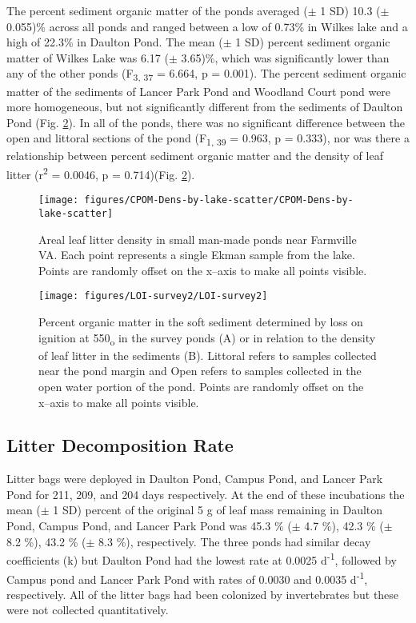 \documentclass{article}
\begin{document}
The percent sediment organic matter of the ponds averaged ($\pm$ 1 SD) 10.3 ($\pm$ 0.055)\% across all ponds and ranged between a low of 0.73\% in Wilkes lake and a high of 22.3\% in Daulton Pond. The mean ($\pm$ 1 SD) percent sediment organic matter of Wilkes Lake was 6.17 ($\pm$ 3.65)\%, which was significantly lower than any of the other ponds (F\textsubscript{3, 37} = 6.664, p = 0.001). The percent sediment organic matter of the sediments of Lancer Park Pond and Woodland Court pond were more homogeneous, but not significantly different from the sediments of Daulton Pond (Fig. \ref{fig:LOI_survey}).  In all of the ponds, there was no significant difference between the open and littoral sections of the pond (F\textsubscript{1, 39} = 0.963, p = 0.333), nor was there a relationship between percent sediment organic matter and the density of leaf litter (r\textsuperscript{2} = 0.0046, p = 0.714)(Fig. \ref{fig:LOI_survey}). 

\begin{figure}[h!]
\begin{center}
\texttt{[image: figures/CPOM-Dens-by-lake-scatter/CPOM-Dens-by-lake-scatter]}
\caption{{\label{fig:CPOM_density} 
Areal leaf litter density in small man-made ponds near Farmville VA. Each point represents a single Ekman sample from the lake. Points are randomly offset on the x--axis to make all points visible.%
}}
\end{center}
\end{figure}

\begin{figure}[h!]
\begin{center}
\texttt{[image: figures/LOI-survey2/LOI-survey2]}
\caption{{\label{fig:LOI_survey}
Percent organic matter in the soft sediment determined by loss on ignition at 550\textsubscript{o} in the survey ponds (A) or in relation to the density of leaf litter in the sediments (B).  Littoral refers to samples collected near the pond margin and Open refers to samples collected in the open water portion of the pond. Points are randomly offset on the x--axis to make all points visible.%
}}
\end{center}
\end{figure}

\subsection{Litter Decomposition Rate}

Litter bags were deployed in Daulton Pond, Campus Pond, and Lancer Park Pond for 211, 209, and 204 days respectively. At the end of these incubations  the mean ($\pm$ 1 SD) percent of  the original 5 g of leaf mass remaining in Daulton Pond, Campus Pond, and Lancer Park Pond was 45.3 \% ($\pm$ 4.7 \%), 42.3 \% ($\pm$ 8.2 \%), 43.2 \% ($\pm$ 8.3 \%), respectively. The three ponds had similar decay coefficients (k) but Daulton Pond had the lowest rate at 0.0025 d\textsuperscript{-1}, followed by Campus pond and Lancer Park Pond with rates of 0.0030 and 0.0035 d\textsuperscript{-1}, respectively. All of the litter bags had been colonized by invertebrates but these were not collected quantitatively.
\end{document}
